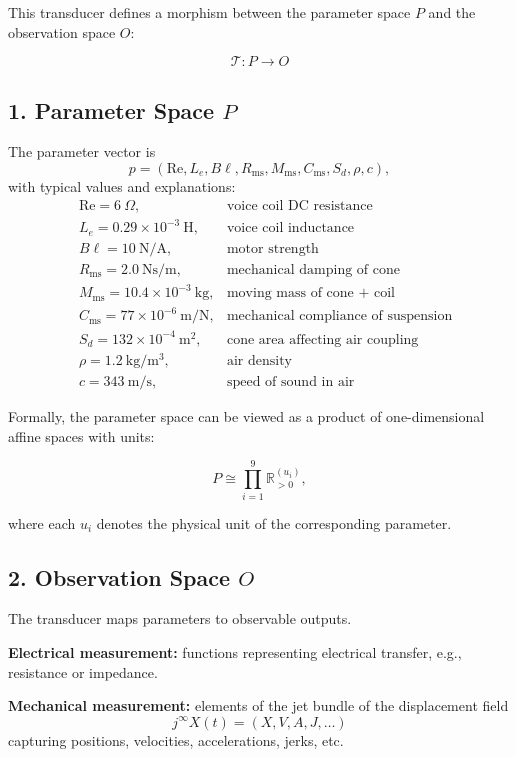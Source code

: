 This transducer defines a morphism between the parameter space $P$ and the observation space $O$:

\[
\mathcal{T} : P \longrightarrow O
\]

\subsection*{1. Parameter Space $P$}

The parameter vector is
\[
p = (\mathrm{Re}, L_e, B\ell, R_\mathrm{ms}, M_\mathrm{ms}, C_\mathrm{ms}, S_d, \rho, c),
\]
with typical values and explanations:
\[
\begin{aligned}
& \mathrm{Re} = 6~\Omega, & \text{voice coil DC resistance} \\
& L_e = 0.29\times 10^{-3}~\mathrm{H}, & \text{voice coil inductance} \\
& B\ell = 10~\mathrm{N/A}, & \text{motor strength} \\
& R_\mathrm{ms} = 2.0~\mathrm{N\!s/m}, & \text{mechanical damping of cone} \\
& M_\mathrm{ms} = 10.4\times 10^{-3}~\mathrm{kg}, & \text{moving mass of cone + coil} \\
& C_\mathrm{ms} = 77\times 10^{-6}~\mathrm{m/N}, & \text{mechanical compliance of suspension} \\
& S_d = 132\times 10^{-4}~\mathrm{m^2}, & \text{cone area affecting air coupling} \\
& \rho = 1.2~\mathrm{kg/m^3}, & \text{air density} \\
& c = 343~\mathrm{m/s}, & \text{speed of sound in air}
\end{aligned}
\]

Formally, the parameter space can be viewed as a product of one-dimensional affine spaces with units:

\[
P \cong \prod_{i=1}^9 \mathbb{R}_{>0}^{(u_i)},
\]

where each $u_i$ denotes the physical unit of the corresponding parameter.

\subsection*{2. Observation Space $O$}
The transducer maps parameters to observable outputs. 

\textbf{Electrical measurement:} functions representing electrical transfer, e.g., resistance or impedance.

\textbf{Mechanical measurement:} elements of the jet bundle of the displacement field
\[
j^\infty X(t) = (X, V, A, J, \dots)
\]
capturing positions, velocities, accelerations, jerks, etc.


